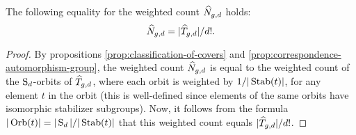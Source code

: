 \begin{lemma} \label{prop:first-reduction-step}
 The following equality for the weighted count $\widehat{N}_{g,d}$ holds: \[\widehat{N}_{g,d}=|\widehat{T}_{g,d}|/d!.\]
\end{lemma}

\begin{proof}
 By propositions \ref{prop:classification-of-covers} and \ref{prop:correspondence-automorphism-group}, the weighted count $\widehat{N}_{g,d}$ is equal to the weighted count of the $\operatorname{S}_d$-orbits of $\widehat{T}_{g,d}$, where each orbit is weighted by $1/|\operatorname{Stab}(t)|$, for any element $t$ in the orbit (this is well-defined since elements of the same orbits have isomorphic stabilizer subgroups). Now, it follows from the formula $|\operatorname{Orb}(t)|=|\operatorname{S}_d|/|\operatorname{Stab}(t)|$ that this weighted count equals $|\widehat{T}_{g,d}|/d!$.
\end{proof}
